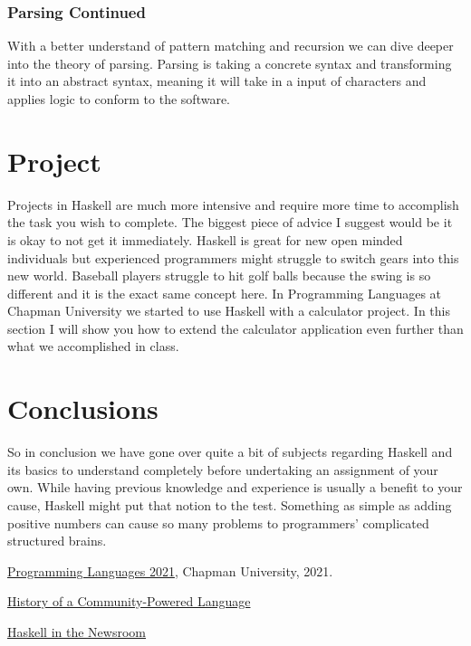 \documentclass{article}
\begin{document}
        \subsubsection{Parsing Continued}
        With a better understand of pattern matching and recursion we can dive deeper into the theory of parsing. Parsing is taking a concrete syntax and transforming it into an abstract syntax, meaning it will take in a input of characters and applies logic to conform to the software. 
    
    

\section{Project}

Projects in Haskell are much more intensive and require more time to accomplish the task you wish to complete. The biggest piece of advice I suggest would be it is okay to not get it immediately. Haskell is great for new open minded individuals but experienced programmers might struggle to switch gears into this new world. Baseball players struggle to hit golf balls because the swing is so different and it is the exact same concept here. In Programming Languages at Chapman University we started to use Haskell with a calculator project. In this section I will show you how to extend the calculator application even further than what we accomplished in class.

\section{Conclusions}\label{conclusions}

So in conclusion we have gone over quite a bit of subjects regarding Haskell and its basics to understand completely before undertaking an assignment of your own. While having previous knowledge and experience is usually a benefit to your cause, Haskell might put that notion to the test. Something as simple as adding positive numbers can cause so many problems to programmers' complicated structured brains. 

\begin{thebibliography}{99}
 \href{https://github.com/alexhkurz/programming-languages-2021/blob/main/README.md}{Programming Languages 2021}, Chapman University, 2021.

\href{https://serokell.io/blog/haskell-history}{History of a Community-Powered Language}

{\href{https://www.infoq.com/presentations/haskell-newsroom-nyt/}{Haskell in the Newsroom}}

\end{thebibliography}
\end{document}
